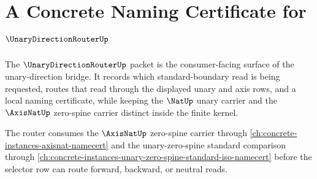 \chapter{A Concrete Naming Certificate for $\UnaryDirectionRouterUp$}
\label{ch:concrete-instances-unary-direction-router-namecert}

The $\UnaryDirectionRouterUp$ packet is the consumer-facing surface of the unary-direction bridge. It records which standard-boundary read is being requested, routes that read through the displayed unary and axis rows, and a local naming certificate, while keeping the $\NatUp$ unary carrier and the $\AxisNatUp$ zero-spine carrier distinct inside the finite kernel.

The router consumes the $\AxisNatUp$ zero-spine carrier through \autoref{ch:concrete-instances-axisnat-namecert} and the unary-zero-spine standard comparison through \autoref{ch:concrete-instances-unary-zero-spine-standard-iso-namecert} before the selector row can route forward, backward, or neutral reads.

